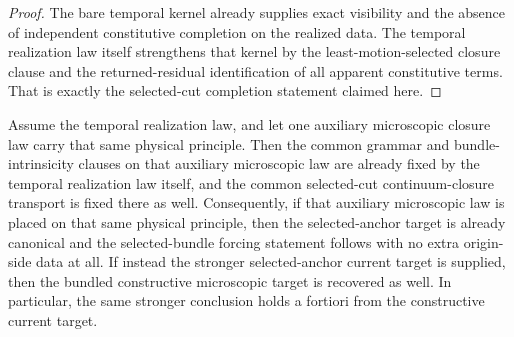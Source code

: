 \begin{proof}
The bare temporal kernel already supplies exact visibility and the absence of
independent constitutive completion on the realized data. The temporal
realization law itself strengthens that kernel by the least-motion-selected
closure clause and the returned-residual identification of all apparent
constitutive terms. That is exactly the selected-cut completion statement
claimed here.
\end{proof}

\begin{theorem}
\label{thm:temporal-law-already-fixes-detached-constructive-clauses}
Assume the temporal realization law, and let one auxiliary microscopic closure
law carry that same physical principle. Then the common grammar and
bundle-intrinsicity clauses on that auxiliary microscopic law are already fixed
by the temporal realization law itself, and the common selected-cut
continuum-closure transport is fixed there as well. Consequently, if that
auxiliary microscopic law is placed on that same physical principle, then the
selected-anchor target is already canonical and the selected-bundle forcing
statement follows with no extra origin-side data at all. If instead the
stronger selected-anchor current target is
supplied, then the bundled constructive microscopic target is recovered as
well. In particular, the same stronger conclusion holds a fortiori from the
constructive current target.
\end{theorem}

